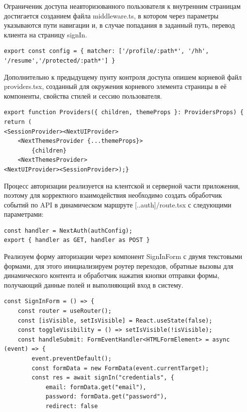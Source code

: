 \documentclass[master, och, pract]{SCWorks}
\begin{document}
Ограниченик доступа неавторизованного пользователя к внутренним страницам достигается созданием файла middleware.ts, в котором через параметры указываются пути навигации и, в случае попадания в заданный путь, перевод клиента на страницу signIn.
\begin{verbatim}
export const config = { matcher: ['/profile/:path*', '/hh', '/resume','/protected/:path*'] }
\end{verbatim}

Дополнительно к предыдущему пунту контроля доступа опишем корневой файл providers.tsx, созданный для окружения корневого элемента страницы в её компоненты, свойства стилей и сессию пользователя.
\begin{verbatim}
export function Providers({ children, themeProps }: ProvidersProps) {
return (
<SessionProvider><NextUIProvider>
    <NextThemesProvider {...themeProps}>
        {children}
    <NextThemesProvider>
<NextUIProvider><SessionProvider>);}    
\end{verbatim}

Процесс авторизации реализуется на клентской и серверной части приложения, поэтому для корректного взаимодействия необходимо создать обработчик событий по API в динамическом маршруте [..auth]/route.tsx с следующими параметрами:
\begin{verbatim}
const handler = NextAuth(authConfig);
export { handler as GET, handler as POST }
\end{verbatim}

Реализуем форму авторизации через компонент SignInForm с двумя текстовыми формами, для этого
инициализируем роутер переходов, обратные вызовы для динамического контента и обработчик нажатия кнопки отправки формы, получающий данные полей и выполняющий вход в систему.
\begin{verbatim}
const SignInForm = () => {
    const router = useRouter();
    const [isVisible, setIsVisible] = React.useState(false);
    const toggleVisibility = () => setIsVisible(!isVisible);
    const handleSubmit: FormEventHandler<HTMLFormElement> = async (event) => {
        event.preventDefault();
        const formData = new FormData(event.currentTarget);
        const res = await signIn("credentials", {
            email: formData.get("email"),
            password: formData.get("password"),
            redirect: false
\end{verbatim}
\end{document}
